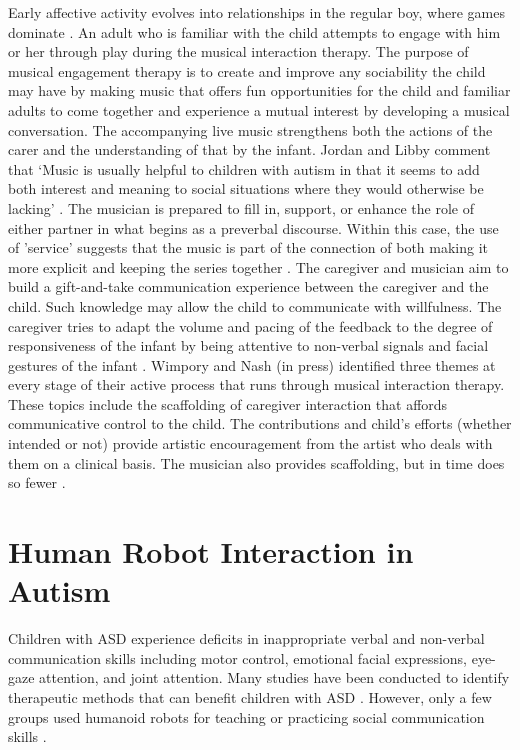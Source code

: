 Early affective activity evolves into relationships in the regular boy, where games dominate \cite{reddy1997communication}. 
An adult who is familiar with the child attempts to engage with him or her through play during 
the musical interaction therapy. The purpose of musical engagement therapy is to create and 
improve any sociability the child may have by making music that offers fun opportunities for 
the child and familiar adults to come together and experience a mutual interest by developing 
a musical conversation. The accompanying live music strengthens both the actions of the carer 
and the understanding of that by the infant. Jordan and Libby comment that ‘Music is 
usually helpful to children with autism in that it seems to add both interest and meaning to 
social situations where they would otherwise be lacking’ \cite{jordan2011developing}. The musician 
is prepared to fill in, support, or enhance the role of either partner in what begins as a preverbal 
discourse. Within this case, the use of 'service' suggests that the music is part of the connection 
of both making it more explicit and keeping the series together \cite{wimpory1999musical}. 
The caregiver and musician aim to build a gift-and-take communication experience between the caregiver 
and the child. Such knowledge may allow the child to communicate with willfulness. The caregiver 
tries to adapt the volume and pacing of the feedback to the degree of responsiveness of the infant 
by being attentive to non-verbal signals and facial gestures of the infant \cite{burford1988action}.
Wimpory and Nash (in press) identified three themes at every stage of their active process that runs 
through musical interaction therapy. These topics include the scaffolding \cite{bruner1985child} of 
caregiver interaction that affords communicative control to the child. The contributions and child's 
efforts (whether intended or not) provide artistic encouragement from the artist who deals with them 
on a clinical basis. The musician also provides scaffolding, but in time does so fewer \cite{wimpory1999musical}.\\

\section{Human Robot Interaction in Autism}
Children with ASD experience deficits in inappropriate verbal and non-verbal communication skills 
including motor control, emotional facial expressions, eye-gaze attention, and joint attention.
Many studies have been conducted to identify therapeutic methods that can benefit children with 
ASD \cite{ricks2010trends}. However, only a few groups used humanoid robots for teaching or practicing social 
communication skills \cite{feil2008robot, dautenhahn2004towards, robins2005robotic, robins2006does, kozima2005interactive, pioggia2005android}.\\

